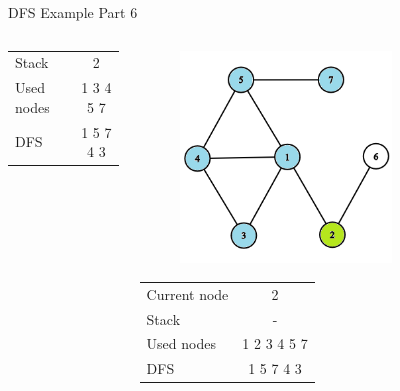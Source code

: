 \documentclass[aspectratio=169]{beamer}%
\begin{document}
\begin{frame}{DFS Example Part 6}
\begin{columns}
\begin{column}{0.32\textwidth}
\begin{table}[ht]
\begin{tabular}{l c}
                    Stack & 2\\ 
                    Used nodes & 1 3 4 5 7\\
                    DFS & 1 5 7 4 3 
                \end{tabular}
            \end{table}
        \end{column}
        \hfill
        \begin{column}{0.32\textwidth}
            \begin{figure}[!ht]
                \centering
                \includegraphics[width=0.9\linewidth]{dfs 17.png}
            \end{figure}
            \begin{table}[ht]
                \centering
                \begin{tabular}{l c}
                    Current node & 2\\
                    Stack & -\\ 
                    Used nodes & 1 2 3 4 5 7\\
                    DFS & 1 5 7 4 3 
                \end{tabular}
            \end{table}
        \end{column}
        \hfill
        \begin{column}{0.32\textwidth}
            \begin{figure}[!ht]

\end{figure}
\end{column}
\end{columns}
\end{frame}
\end{document}
